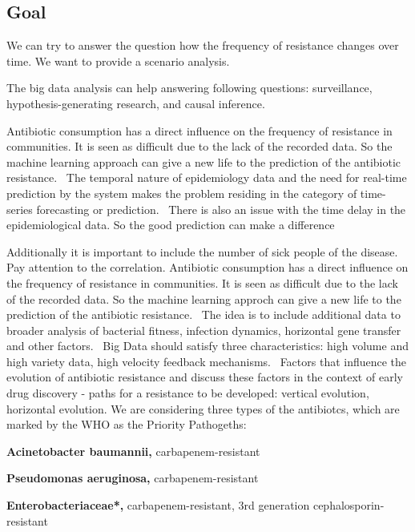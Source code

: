 \documentclass[12pt]{article}
\begin{document}
\subsection{Goal}

We can try to answer the question how the frequency of resistance changes over time. We want to provide a scenario analysis. 

The big data analysis can help answering following questions: surveillance, hypothesis-generating research, and causal inference.~\cite{Mooney.2018}

Antibiotic consumption has a direct influence on the frequency of resistance in communities. It is seen as difficult due to the lack of the recorded data. So the machine learning approach can give a new life to the prediction of the antibiotic resistance.~\cite{Austin.}
The temporal nature of epidemiology data and the need for real-time prediction by the system makes the problem residing in the category of time-series forecasting or prediction.~\cite{Cho.03.06.2014b} There is also an issue with the time delay in the epidemiological data. So the good prediction can make a difference~\cite{Harvard.}

Additionally it is important to include the number of sick people of the disease. Pay attention to the correlation.
Antibiotic consumption has a direct influence on the frequency of resistance in communities. It is seen as difficult due to the lack of the recorded data. So the machine learning approch can give a new life to the prediction of the antibiotic resistance.~\cite{Austin.}
The idea is to include additional data to broader analysis of bacterial fitness, infection dynamics, horizontal gene transfer and other factors.~\cite[S.~689]{Sommer.2017b}
Big Data should satisfy three characteristics: high volume and high variety data, high velocity feedback mechanisms.~\cite{Mooney.2015}
Factors that influence the evolution of antibiotic resistance and discuss these factors in the context of early drug discovery - paths for a resistance to be developed: vertical evolution, horizontal evolution. We are considering three types of the antibiotcs, which are marked by the WHO as the Priority Pathogeths: 

\textbf{Acinetobacter baumannii, }carbapenem-resistant

\textbf{Pseudomonas aeruginosa, }carbapenem-resistant 

\textbf{Enterobacteriaceae*, }carbapenem-resistant, 3rd generation cephalosporin-resistant~\cite{Tacconelli.}
\end{document}
